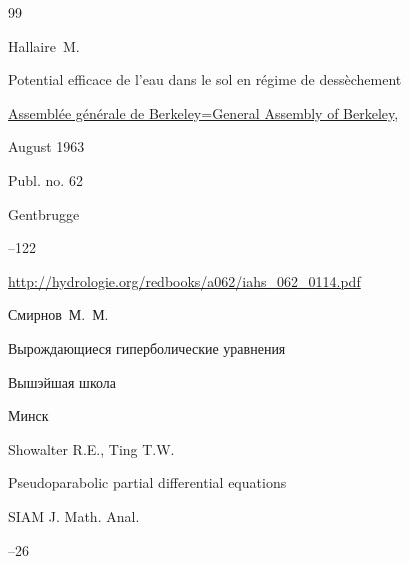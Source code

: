 







\begin{thebibliography}{99}




\by Hallaire~M.

\paper Potential efficace de l'eau dans le sol en r\'egime de dess\`echement 

\inbook \href{http://hydrologie.org/redbooks/062.htm}{Assembl\'ee g\'en\'erale de Berkeley=General Assembly of Berkeley}\rm, \nofrills

\procinfo August 1963

\bookinfo Publ. no. 62


\publaddr Gentbrugge

--122 

\elink \url{http://hydrologie.org/redbooks/a062/iahs_062_0114.pdf}




\by Смирнов~М.~М.

\book Вырождающиеся гиперболические уравнения


\publ Вышэйшая школа

\publaddr Минск









\by Showalter R.E., Ting T.W.

\paper Pseudoparabolic partial differential equations

\jour SIAM J. Math. Anal.




--26






\end{thebibliography}

